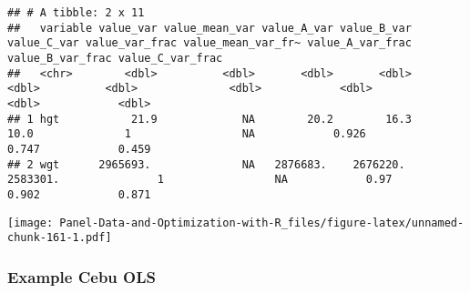 \documentclass[
]{book}
\newenvironment{Shaded}{\begin{snugshade}}{\end{snugshade}}
\newcommand{\DataTypeTok}[1]{\textcolor[rgb]{0.13,0.29,0.53}{#1}}
\newcommand{\DecValTok}[1]{\textcolor[rgb]{0.00,0.00,0.81}{#1}}
\newcommand{\KeywordTok}[1]{\textcolor[rgb]{0.13,0.29,0.53}{\textbf{#1}}}
\newcommand{\NormalTok}[1]{#1}
\newcommand{\OperatorTok}[1]{\textcolor[rgb]{0.81,0.36,0.00}{\textbf{#1}}}
\newcommand{\OtherTok}[1]{\textcolor[rgb]{0.56,0.35,0.01}{#1}}
\newcommand{\StringTok}[1]{\textcolor[rgb]{0.31,0.60,0.02}{#1}}
\begin{document}
\begin{Shaded}
\end{Shaded}

\begin{verbatim}
## # A tibble: 2 x 11
##   variable value_var value_mean_var value_A_var value_B_var value_C_var value_var_frac value_mean_var_fr~ value_A_var_frac value_B_var_frac value_C_var_frac
##   <chr>        <dbl>          <dbl>       <dbl>       <dbl>       <dbl>          <dbl>              <dbl>            <dbl>            <dbl>            <dbl>
## 1 hgt           21.9             NA        20.2        16.3        10.0              1                 NA            0.926            0.747            0.459
## 2 wgt      2965693.              NA   2876683.    2676220.    2583301.               1                 NA            0.97             0.902            0.871
\end{verbatim}

\begin{Shaded}
\end{Shaded}

\texttt{[image: Panel-Data-and-Optimization-with-R\_files/figure-latex/unnamed-chunk-161-1.pdf]}

\hypertarget{example-cebu-ols}{%
\subsubsection{Example Cebu OLS}\label{example-cebu-ols}}

\begin{Shaded}
\end{Shaded}
\end{document}
